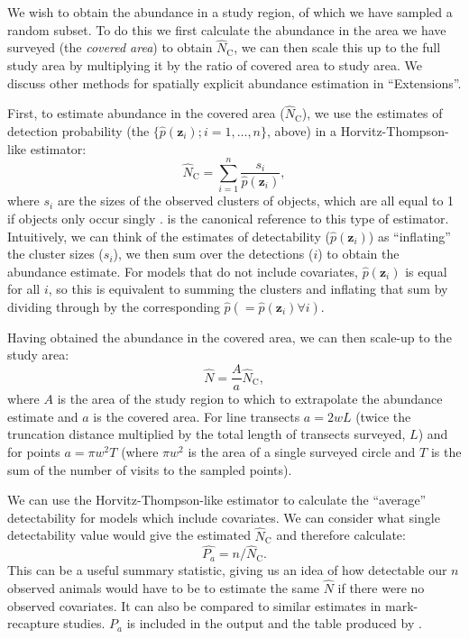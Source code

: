 \documentclass[article]{jss}\usepackage[]{graphicx}\usepackage[]{color}
\begin{document}
We wish to obtain the abundance in a study region, of which we have sampled a random subset. To do this we first calculate the abundance in the area we have surveyed (the \textit{covered area}) to obtain $\hat{N}_\text{C}$, we can then scale this up to the full study area by multiplying it by the ratio of covered area to study area. We discuss other methods for spatially explicit abundance estimation in ``Extensions''.

First, to estimate abundance in the covered area ($\hat{N}_\text{C}$), we use the estimates of detection probability (the $\{\hat{p}(\mathbf{z}_i); i=1,\ldots,n\}$, above) in a Horvitz-Thompson-like estimator:
\begin{equation}
\hat{N}_\text{C} = \sum_{i=1}^n\frac{s_i}{\hat{p}(\mathbf{z}_i)},
\label{ht}
\end{equation}
where $s_i$ are the sizes of the observed clusters of objects, which are all equal to 1 if objects only occur singly \citep{Borchers:2004wr}. \cite{thompson2012sampling} is the canonical reference to this type of estimator. Intuitively, we can think of the estimates of detectability ($\hat{p}(\mathbf{z}_i)$) as ``inflating'' the cluster sizes ($s_i$), we then sum over the detections ($i$) to obtain the abundance estimate. For models that do not include covariates, $\hat{p}(\mathbf{z}_i)$ is equal for all $i$, so this is equivalent to summing the clusters and inflating that sum by dividing through by the corresponding $\hat{p} (=\hat{p}(\mathbf{z}_i) \forall i)$.

Having obtained the abundance in the covered area, we can then scale-up to the study area:
$$
\hat{N} = \frac{A}{a} \hat{N}_\text{C},
$$
where $A$ is the area of the study region to which to extrapolate the abundance estimate and $a$ is the covered area. For line transects $a=2wL$ (twice the truncation distance multiplied by the total length of transects surveyed, $L$) and for points $a=\pi w^2 T$ (where $\pi w^2$ is the area of a single surveyed circle and $T$ is the sum of the number of visits to the sampled points).

We can use the Horvitz-Thompson-like estimator to calculate the ``average'' detectability for models which include covariates. We can consider what single detectability value would give the estimated $\hat{N}_\text{C}$ and therefore calculate:
$$
\hat{P_a} = n/\hat{N}_\text{C}.
$$
This can be a useful summary statistic, giving us an idea of how detectable our $n$ observed animals would have to be to estimate the same $\hat{N}$ if there were no observed covariates. It can also be compared to similar estimates in mark-recapture studies. $P_a$ is included in the  output and the table produced by . 
\end{document}
